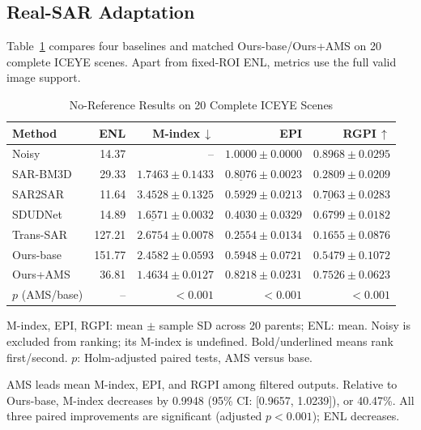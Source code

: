 \documentclass[journal]{IEEEtran}
\newcommand{\rev}[1]{{\color{RevisionBlue}#1}}
\newcommand{\rev}[1]{#1}
\begin{document}
\subsection{Real-SAR Adaptation}
\rev{Table~\ref{tab:real} compares four baselines and matched Ours-base/Ours+AMS on 20 complete ICEYE scenes. Apart from fixed-ROI ENL, metrics use the full valid image support.}

\begin{table}[!t]
\caption{\rev{No-Reference Results on 20 Complete ICEYE Scenes}}
\label{tab:real}
\centering
\footnotesize
\setlength{\tabcolsep}{1.1pt}
\renewcommand{\arraystretch}{1.04}
\rev{\begin{tabular*}{\columnwidth}{@{\extracolsep{\fill}}lrrrr@{}}
\toprule
\textbf{Method} & \textbf{ENL} & \textbf{M-index}\,$\downarrow$ & \textbf{EPI} & \textbf{RGPI}\,$\uparrow$ \\
\midrule
Noisy & 14.37 & -- & \(1.0000{\pm}0.0000\) & \(0.8968{\pm}0.0295\) \\
SAR-BM3D & 29.33 & \(1.7463{\pm}0.1433\) & \(\underline{0.8076}{\pm}0.0023\) & \(0.2809{\pm}0.0209\) \\
SAR2SAR & 11.64 & \(3.4528{\pm}0.1325\) & \(0.5929{\pm}0.0213\) & \(\underline{0.7063}{\pm}0.0283\) \\
SDUDNet & 14.89 & \(\underline{1.6571}{\pm}0.0032\) & \(0.4030{\pm}0.0329\) & \(0.6799{\pm}0.0182\) \\
Trans-SAR & 127.21 & \(2.6754{\pm}0.0078\) & \(0.2554{\pm}0.0134\) & \(0.1655{\pm}0.0876\) \\
Ours-base & 151.77 & \(2.4582{\pm}0.0593\) & \(0.5948{\pm}0.0721\) & \(0.5479{\pm}0.1072\) \\
Ours+AMS & 36.81 & \(\mathbf{1.4634}{\pm}0.0127\) & \(\mathbf{0.8218}{\pm}0.0231\) & \(\mathbf{0.7526}{\pm}0.0623\) \\
\midrule
\(p\) (AMS/base) & -- & \(<0.001\) & \(<0.001\) & \(<0.001\) \\
\bottomrule
\end{tabular*}}
\vspace{1pt}
\parbox{\columnwidth}{\footnotesize\rev{M-index, EPI, RGPI: mean \(\pm\) sample SD across 20 parents; ENL: mean. Noisy is excluded from ranking; its M-index is undefined. Bold/underlined means rank first/second. \(p\): Holm-adjusted paired tests, AMS versus base.}}
\end{table}

\rev{AMS leads mean M-index, EPI, and RGPI among filtered outputs. Relative to Ours-base, M-index decreases by 0.9948 (95\% CI: [0.9657, 1.0239]), or 40.47\%. All three paired improvements are significant (adjusted \(p<0.001\)); ENL decreases.}
\end{document}
